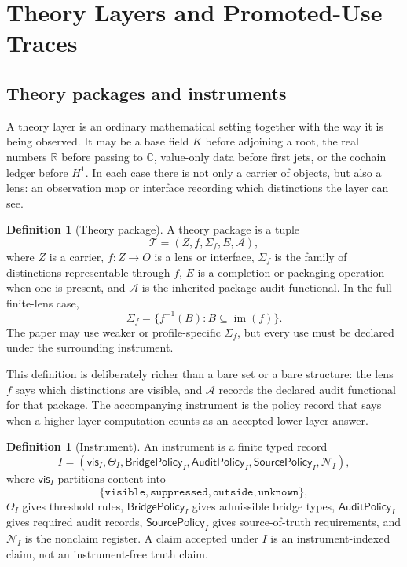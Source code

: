 \documentclass[11pt]{article}
\newcommand{\R}{\mathbb R}
\providecommand{\C}{}
\renewcommand{\C}{\mathbb C}
\theoremstyle{definition}
\newtheorem{definition}[theorem]{Definition}
\begin{document}
 \section{Theory Layers and Promoted-Use Traces}\label{sec:layers}

\subsection{Theory packages and instruments}
\label{subsec:layers-packages-instruments}

A theory layer is an ordinary mathematical setting together with the way it is
being observed.  It may be a base field \(K\) before adjoining a root, the
real numbers \(\R\) before passing to \(\C\), value-only data before first
jets, or the cochain ledger before \(H^1\).  In each case there is not only a
carrier of objects, but also a lens: an observation map or interface recording
which distinctions the layer can see.

\begin{definition}[Theory package]
\label{def:sau-theory-package}
A theory package is a tuple
\[
\mathcal T=(Z,f,\Sigma_f,E,\mathcal A),
\]
where \(Z\) is a carrier, \(f:Z\to O\) is a lens or interface, \(\Sigma_f\) is the family of distinctions representable through \(f\), \(E\) is a completion or packaging operation when one is present, and \(\mathcal A\) is the inherited package audit functional. In the full finite-lens case,
\[
\Sigma_f=\{f^{-1}(B):B\subseteq \operatorname{im}(f)\}.
\]
The paper may use weaker or profile-specific \(\Sigma_f\), but every use must be declared under the surrounding instrument.
\end{definition}

This definition is deliberately richer than a bare set or a bare structure:
the lens \(f\) says which distinctions are visible, and \(\mathcal A\) records
the declared audit functional for that package.  The accompanying instrument
is the policy record that says when a higher-layer computation counts as an
accepted lower-layer answer.

\begin{definition}[Instrument]
\label{def:sau-instrument}
An instrument is a finite typed record
\[
I=(\mathsf{vis}_I,\Theta_I,\mathsf{BridgePolicy}_I,\mathsf{AuditPolicy}_I,
\mathsf{SourcePolicy}_I,\mathcal N_I),
\]
where \(\mathsf{vis}_I\) partitions content into
\[
\{\texttt{visible},\texttt{suppressed},\texttt{outside},\texttt{unknown}\},
\]
\(\Theta_I\) gives threshold rules, \(\mathsf{BridgePolicy}_I\) gives admissible bridge types, \(\mathsf{AuditPolicy}_I\) gives required audit records, \(\mathsf{SourcePolicy}_I\) gives source-of-truth requirements, and \(\mathcal N_I\) is the nonclaim register. A claim accepted under \(I\) is an instrument-indexed claim, not an instrument-free truth claim.
\end{definition}
\end{document}
